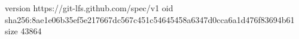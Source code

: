 version https://git-lfs.github.com/spec/v1
oid sha256:8ae1e06b35ef5e217667dc567c451c54645458a6347d0cca6a1d476f83694b61
size 43864
